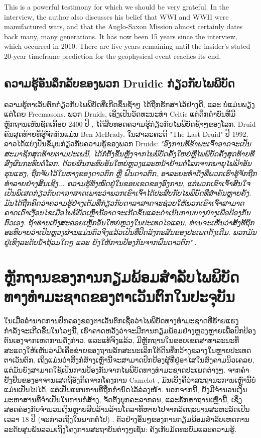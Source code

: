 \documentclass[10pt,twocolumn,letterpaper]{article}
\begin{document}
This is a powerful testimony for which we should be very grateful. In the interview, the author also discusses his belief that WWI and WWII were manufactured wars, and that the Anglo-Saxon Mission almost certainly dates back many, many generations. It has now been 15 years since the interview, which occurred in 2010. There are five years remaining until the insider's stated 20-year timeframe prediction for the geophysical event reaches its end.
\subsection{ຄວາມຮູ້ອັນລຶກລັບຂອງພວກ Druidic ກ່ຽວກັບໄພພິບັດ}

ຄວາມຮູ້ຕາເວັນຕົກກ່ຽວກັບໄພພິບັດທີ່ເກີດຂຶ້ນຊ້ຳໆ ໄດ້ຖືກຮັກສາໄວ້ຢ່າງດີ, ແລະ ບໍ່ແມ່ນພຽງແຕ່ໂດຍ Freemasons. ພວກ Druids, ເຊິ່ງເປັນວັດທະນະທຳ Celtic ແຕ່ດຶກດຳບັນທີ່ມີຫຼັກຖານເຫັນຊັດເກືອບ 2400 ປີ \cite{7}, ໄດ້ສືບທອດຄວາມຮູ້ກ່ຽວກັບໄພພິບັດຊ້ຳໆຂອງໂລກ. Druid ຄົນສຸດທ້າຍທີ່ຮູ້ຈັກກັນແມ່ນ Ben McBrady. ໃນສາລະຄະດີ "The Last Druid" ປີ 1992, ລາວໄດ້ແບ່ງປັນຂໍ້ມູນກ່ຽວກັບຄວາມຮູ້ຂອງພວກ Druids: \textit{"ອົງການທີ່ຂ້າພະເຈົ້າອາດຈະເປັນສະມາຊິກສຸດທ້າຍຕາມປະເພນີ, ໄດ້ກໍ່ຕັ້ງຂຶ້ນຫຼັງຈາກໄພພິບັດຄັ້ງໃຫຍ່ຫຼືໄພພິບັດຄັ້ງສຸດທ້າຍທີ່ສົ່ງຜົນກະທົບຕໍ່ໂລກ. ດ້ວຍຜົນກະທົບອັນໃຫຍ່ຫຼວງແລະຫນ້າຢ້ານຕໍ່ໂລກຈາກພາຍຸໄຟຟ້າອັນຮຸນແຮງ, ຖືກຈັບໄວ້ໃນຫາງຂອງດາວຕົກ ຫຼື ຝົນດາວຕົກ, ອາລະຍະທຳດັ່ງທີ່ພວກເຮົາຮູ້ຈັກຖືກທຳລາຍຢ່າງສິ້ນເຊີງ... ຄວາມຮູ້ທັງໝົດຢູ່ໃນຂອບເຂດຂອງອົງການ, ແຕ່ພວກເຂົາເຈົ້າສົນໃຈເປັນພິເສດກ່ຽວກັບດາລາສາດເພາະວ່າພວກເຂົາເຈົ້າໄດ້ປະສົບກັບໄພພິບັດທີ່ສຳຄັນຫຼາຍຄັ້ງ. ມັນໄດ້ຖືກຄິດວ່າຄວາມຮູ້ຢ່າງເຕັມທີ່ກ່ຽວກັບດາລາສາດຈະຊ່ວຍໃຫ້ພວກເຂົາເຈົ້າສາມາດຄາດເດົາເງື່ອນໄຂເມື່ອໄພພິບັດເຫຼົ່ານີ້ອາດຈະເກີດຂຶ້ນແລະດຳເນີນການບາງຢ່າງເພື່ອປ້ອງກັນຕົວເອງ. ຖ້າທ່ານເບິ່ງສະລອຍເຫຼັກອັນໃຫຍ່ຫຼວງໃນປະເທດໄອແລນ, ທ່ານຈະເຫັນວ່າສິ່ງທີ່ຖືກອະທິບາຍວ່າເປັນຫຼວງຜ່ານແມ່ນຕົວຈິງແລ້ວເປັນທີ່ປິດລັງກະສັນຂອງປະເພດດັ້ງເດີມ. ພວກມັນຢູ່ເທິງລະດັບນ້ຳຖ້ວມໃດໆ ແລະ ຍັງໃຫ້ການປ້ອງກັນຈາກຝົນດາວຕົກ"} \cite{8,9}.

\section{ຫຼັກຖານຂອງການກຽມພ້ອມສຳລັບໄພພິບັດທາງທຳມະຊາດຂອງຕາເວັນຕົກໃນປະຈຸບັນ}

ໃນເມື່ອອຳນາດການປົກຄອງຂອງຕາເວັນຕົກເຊື່ອວ່າໄພພິບັດທາງທຳມະຊາດທີ່ຮ້າຍແຮງກຳລັງຈະເກີດຂຶ້ນໃນໄວໆນີ້, ເຮົາຄາດຫວັງວ່າຈະມີການກຽມພ້ອມຢ່າງຫຼວງຫຼາຍເພື່ອປົກປ້ອງຕົນເອງຈາກເຫດການດັ່ງກ່າວ. ແລະແທ້ຈິງແລ້ວ, ມີຫຼັກຖານໃນຂອບເຂດສາທາລະນະທີ່ສະແດງໃຫ້ເຫັນວ່າມີເຄືອຂ່າຍຂອງຖານລັກສະນະເລິກໃຕ້ດິນທີ່ກວ້າງຂວາງໃນຫຼາຍປະເທດຕາເວັນຕົກ. ເຖິງແມ່ນວ່າສິ່ງກໍ່ສ້າງເຫຼົ່ານີ້ຈະສາມາດປົກປ້ອງຜູ້ທີ່ຢູ່ອາໄສໃນສົງຄາມນິວເຄລຍ, ແຕ່ມັນຍັງສາມາດໃຊ້ເປັນການປ້ອງກັນຈາກໄພພິບັດທາງທຳມະຊາດປະເພດຕ່າງໆ. ຈາກຄຳຢັ້ງຢືນຂອງອາຈານເສດຖີອັງກິດຈາກໂຄງການ Camelot \cite{4,6}, ມັນເບິ່ງຄືວ່າສະຖານະການເຫຼົ່ານີ້ບໍ່ແມ່ນເປັນໄປໄດ້, ແຕ່ເປັນແຜນການທີ່ຖືກກຳນົດໄວ້ລ່ວງໜ້າ. ນອກຈາກນີ້, ຍັງມີຈຳນວນເງິນມະຫາສານທີ່ຈຳເປັນໃນການກໍ່ສ້າງ, ຈັດຕັ້ງບຸກຄະລາກອນ, ແລະຮັກສາຖານເຫຼົ່ານີ້, ເຊິ່ງສອດຄ່ອງກັບຈຳນວນເງິນຫຼາຍສິບລ້ານລ້ານໂດລາທີ່ຫາຍໄປຈາກລັດຖະບານສະຫະລັດເປັນເວລາ 18 ປີ (ຈະກ່າວເຖິງໃນພາກຕໍ່ໄປ) \cite{11,12,13}. ຕົວຢ່າງອື່ນໆຂອງການກຽມພ້ອມສຳລັບເຫດການລະດັບສູນພັນລວມເຖິງໂຄງການສະຖາບັນຕ່າງໆເຊັ່ນ: ຄັງເກັບມັດທະຍົມແລະຄວາມຮູ້.
\end{document}
